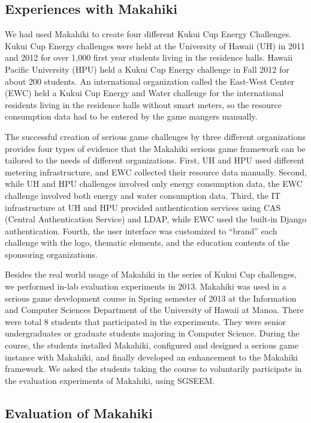 \documentclass{sigchi}
\begin{document}
\subsection{Experiences with Makahiki}

We had used Makahiki to create four different Kukui
Cup Energy Challenges. Kukui Cup Energy challenges were held at the
University of Hawaii (UH) in 2011 and 2012 for over 1,000 first
year students living in the residence halls. Hawaii Pacific University
(HPU) held a Kukui Cup Energy challenge in Fall 2012 for about 200
students. An international organization called the East-West Center
(EWC) held a Kukui Cup Energy and Water challenge for the
international residents living in the residence halls without smart
meters, so the resource consumption data had to be entered by the game
mangers manually.

The successful creation of serious game challenges by three different organizations
provides four types of evidence that the Makahiki serious game framework can be tailored
to the needs of different organizations. First, UH and HPU used different metering
infrastructure, and EWC collected their resource data manually.  Second, while UH and HPU
challenges involved only energy consumption data, the EWC challenge involved both energy
and water consumption data. Third, the IT infrastructure at UH and HPU provided
authentication services using CAS (Central Authentication Service) and LDAP, while EWC
used the built-in Django authentication.  Fourth, the user interface was customized to
``brand'' each challenge with the logo, thematic elements, and the education contents of
the sponsoring organizations.

Besides the real world usage of Makahiki in the series of Kukui Cup challenges, we
performed in-lab evaluation experiments in 2013. Makahiki was used in a serious game development
course in Spring semester of 2013 at the Information and Computer Sciences Department of the
University of Hawaii at Manoa. There were total 8 students that participated in the experiments.
They were senior undergraduates or graduate students majoring in Computer Science. During the
course, the students installed Makahiki, configured and designed a serious game instance with
Makahiki, and finally developed an enhancement to the Makahiki framework. We asked the students
taking the course to voluntarily participate in the evaluation experiments of Makahiki, using
SGSEEM.

\subsection{Evaluation of Makahiki}
\end{document}
